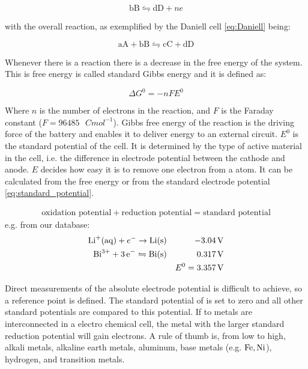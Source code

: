 	$$\text{bB} \leftrightharpoons \text{dD} + ne $$
	
	with the overall reaction, as exemplified by the Daniell cell  \ref{eq:Daniell} being:
	
	\begin{equation}
	\text{aA} + \text{bB} \leftrightharpoons \text{cC} + \text{dD}
	\label{eq:redox}
	\end{equation}
	
	
	Whenever there is a reaction there is a decrease in the free energy of the system.  This is free energy is called standard Gibbs energy and it is defined as:
	
	$$\Delta G^0 = -nFE^0$$
	
	Where $n$ is the number of electrons in the reaction, and $F$ is the Faraday constant ($F = 96485\text{ }\si{C mol^{-1}}$). Gibbs free energy of the reaction is the driving force of the battery and enables it to deliver energy to an external circuit. $E^0$ is the standard potential of the cell. It is determined by the type of active material in the cell, i.e. the difference in electrode potential between the cathode and anode. $E$ decides how easy it is to remove one electron from a atom. It can be calculated from the free energy or from the standard electrode potential \ref{eq:standard_potential}.
	
\begin{align}\label{eq:standard_potential}	
\text{oxidation potential} + \text{reduction potential} = \text{standard potential}
\end{align}
	e.g. from our database:	
	\begin{align}
	\ce{Li^+(aq)} + e^- \rightarrow \ce{Li (s)} &  & \SI{-3.04}{V}\\
	\ce{Bi^{3+}} + \ce{3e^-} \leftrightharpoons \ce{Bi(s)} &  & \SI{0.317}{V} \\
		& &  E^0 =  \SI{3.357}{V}
 	\end{align}
	
	Direct measurements of the absolute electrode potential is difficult to achieve, so a reference point is defined. The standard potential of  is set to zero and all other standard potentials are compared to this potential. If to metals are interconnected in a electro chemical cell, the metal with the larger standard reduction potential will gain electrons. A rule of thumb is, from low to high, alkali metals, alkaline earth metals, aluminum, base metals (e.g. $\ce{Fe}, \ce{Ni}$), hydrogen, and transition metals.
	
